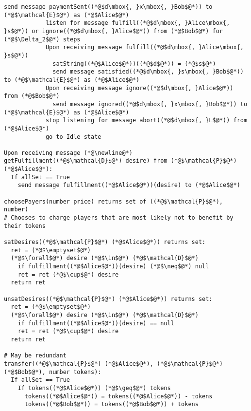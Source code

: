 \begin{lstlisting}[label=satfunc, style=numbers]
            send message paymentSent((*@$d\mbox{, }x\mbox{, }Bob$@*)) to (*@$\mathcal{E}$@*) as (*@$Alice$@*)
            listen for message fulfill((*@$d\mbox{, }Alice\mbox{, }s$@*)) or ignore((*@$d\mbox{, }Alice$@*)) from (*@$Bob$@*) for (*@$\Delta_2$@*) steps
            Upon receiving message fulfill((*@$d\mbox{, }Alice\mbox{, }s$@*))
              satString((*@$Alice$@*))((*@$d$@*)) = (*@$s$@*)
              send message satisfied((*@$d\mbox{, }s\mbox{, }Bob$@*)) to (*@$\mathcal{E}$@*) as (*@$Alice$@*)
            Upon receiving message ignore((*@$d\mbox{, }Alice$@*)) from (*@$Bob$@*)
              send message ignored((*@$d\mbox{, }x\mbox{, }Bob$@*)) to (*@$\mathcal{E}$@*) as (*@$Alice$@*)
            stop listening for message abort((*@$d\mbox{, }L$@*)) from (*@$Alice$@*)
            go to Idle state

Upon receiving message (*@\newline@*) getFulfillment((*@$\mathcal{D}$@*) desire) from (*@$\mathcal{P}$@*) (*@$Alice$@*):
  If allSet == True
    send message fulfillment((*@$Alice$@*))(desire) to (*@$Alice$@*)

choosePayers(number price) returns set of ((*@$\mathcal{P}$@*), number)
# Chooses to charge players that are most likely not to benefit by their tokens

satDesires((*@$\mathcal{P}$@*) (*@$Alice$@*)) returns set:
  ret = (*@$\emptyset$@*)
  (*@$\forall$@*) desire (*@$\in$@*) (*@$\mathcal{D}$@*)
    if fulfillment((*@$Alice$@*))(desire) (*@$\neq$@*) null
    ret = ret (*@$\cup$@*) desire
  return ret

unsatDesires((*@$\mathcal{P}$@*) (*@$Alice$@*)) returns set:
  ret = (*@$\emptyset$@*)
  (*@$\forall$@*) desire (*@$\in$@*) (*@$\mathcal{D}$@*)
    if fulfillment((*@$Alice$@*))(desire) == null
    ret = ret (*@$\cup$@*) desire
  return ret

# May be redundant
transfer((*@$\mathcal{P}$@*) (*@$Alice$@*), (*@$\mathcal{P}$@*) (*@$Bob$@*), number tokens):
  If allSet == True
    If tokens((*@$Alice$@*)) (*@$\geq$@*) tokens
      tokens((*@$Alice$@*)) = tokens((*@$Alice$@*)) - tokens
      tokens((*@$Bob$@*)) = tokens((*@$Bob$@*)) + tokens
\end{lstlisting}
